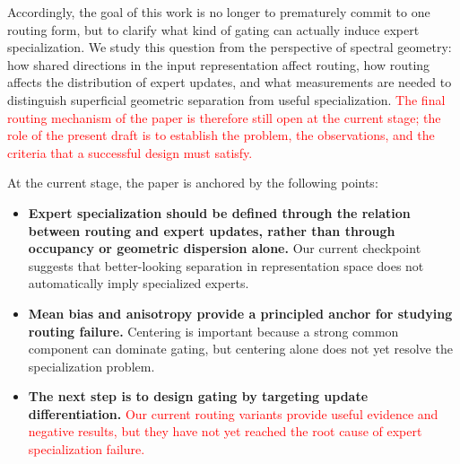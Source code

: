 Accordingly, the goal of this work is no longer to prematurely commit to one routing form, but to clarify what kind of gating can actually induce expert specialization. We study this question from the perspective of spectral geometry: how shared directions in the input representation affect routing, how routing affects the distribution of expert updates, and what measurements are needed to distinguish superficial geometric separation from useful specialization. \textcolor{red}{The final routing mechanism of the paper is therefore still open at the current stage; the role of the present draft is to establish the problem, the observations, and the criteria that a successful design must satisfy.}

At the current stage, the paper is anchored by the following points:
\begin{itemize}
    \item \textbf{Expert specialization should be defined through the relation between routing and expert updates, rather than through occupancy or geometric dispersion alone.} Our current checkpoint suggests that better-looking separation in representation space does not automatically imply specialized experts.
    \item \textbf{Mean bias and anisotropy provide a principled anchor for studying routing failure.} Centering is important because a strong common component can dominate gating, but centering alone does not yet resolve the specialization problem.
    \item \textbf{The next step is to design gating by targeting update differentiation.} \textcolor{red}{Our current routing variants provide useful evidence and negative results, but they have not yet reached the root cause of expert specialization failure.}
\end{itemize}
